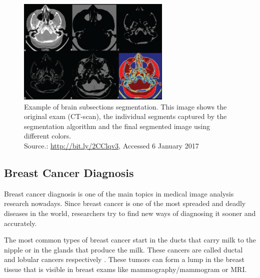 \documentclass[
  twoside,
  11pt, a4paper,
  footinclude=true,
  headinclude=true,
  cleardoublepage=empty
]{scrbook}
\begin{document}
        \begin{figure}[t]
          \centering
          \includegraphics[width=0.65\textwidth]{"./img/img-classification-segmentation"}
          \caption[Example of brain subsections segmentation]{Example of brain subsections segmentation. This image shows the original exam (CT-scan), the individual segments captured by the segmentation algorithm and the final segmented image using different colors.
          \\Source.: \href{http://bit.ly/2CClqv3}{http://bit.ly/2CClqv3}, Accessed 6 January 2017}
          \label{background:medical-image:segmentation}
        \end{figure}

      \subsection{Breast Cancer Diagnosis} \label{background:medical-image:breast-cancer-diagnosis}
        Breast cancer diagnosis is one of the main topics in medical image analysis research nowadays. Since breast cancer is one of the most spreaded and deadly diseases in the world, researchers try to find new ways of diagnosing it sooner and accurately.

        The most common types of breast cancer start in the ducts that carry milk to the nipple or in the glands that produce the milk. These cancers are called ductal and lobular cancers respectively \cite{hunt2012diseases}. These tumors can form a lump in the breast tissue that is visible in breast exams like mammography/mammogram or MRI.
\end{document}
